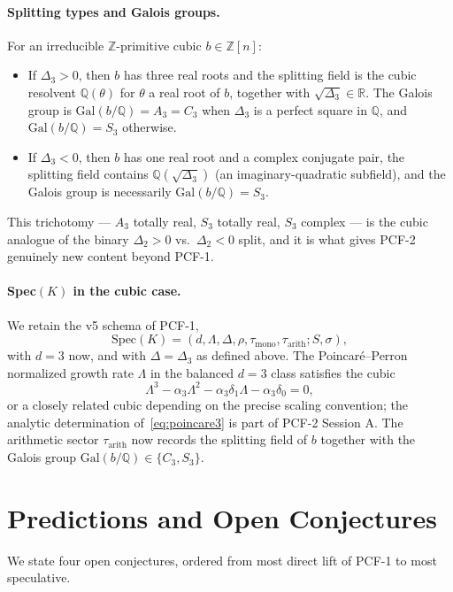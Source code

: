 \documentclass[11pt,a4paper]{article}
\theoremstyle{definition}
\theoremstyle{remark}
\newcommand{\Q}{\mathbb{Q}}
\newcommand{\Z}{\mathbb{Z}}
\newcommand{\R}{\mathbb{R}}
\newcommand{\Gal}{\mathrm{Gal}}
\newcommand{\Spec}{\mathrm{Spec}}
\begin{document}
\paragraph{Splitting types and Galois groups.}
For an irreducible $\Z$-primitive cubic $b\in\Z[n]$:
\begin{itemize}
\item If $\Delta_{3}>0$, then $b$ has three real roots and the splitting
field is the cubic resolvent $\Q(\theta)$ for $\theta$ a real root of $b$,
together with $\sqrt{\Delta_{3}}\in\R$. The Galois group is
$\Gal(b/\Q)=A_{3}=C_{3}$ when $\Delta_{3}$ is a perfect square in $\Q$,
and $\Gal(b/\Q)=S_{3}$ otherwise.
\item If $\Delta_{3}<0$, then $b$ has one real root and a complex
conjugate pair, the splitting field contains $\Q(\sqrt{\Delta_{3}})$
(an imaginary-quadratic subfield), and the Galois group is necessarily
$\Gal(b/\Q)=S_{3}$.
\end{itemize}
This trichotomy --- $A_{3}$ totally real, $S_{3}$ totally real,
$S_{3}$ complex --- is the cubic analogue of the binary
$\Delta_{2}>0$ vs.\ $\Delta_{2}<0$ split, and it is what gives PCF-2
genuinely new content beyond PCF-1.

\paragraph{Spec$(K)$ in the cubic case.}
We retain the v5 schema of PCF-1,
\[
\Spec(K)=(d,\Lambda,\Delta,\rho,\tau_{\mathrm{mono}},\tau_{\mathrm{arith}};S,\sigma),
\]
with $d=3$ now, and with $\Delta=\Delta_{3}$ as defined above. The
Poincar\'e--Perron normalized growth rate $\Lambda$ in the balanced
$d=3$ class satisfies the cubic
\begin{equation}\label{eq:poincare3}
\Lambda^{3}-\alpha_{3}\Lambda^{2}-\alpha_{3}\delta_{1}\Lambda-\alpha_{3}\delta_{0}=0,
\end{equation}
or a closely related cubic depending on the precise scaling
convention; the analytic determination of~\eqref{eq:poincare3} is part
of PCF-2 Session A. The arithmetic sector $\tau_{\mathrm{arith}}$ now
records the splitting field of $b$ together with the Galois group
$\Gal(b/\Q)\in\{C_{3},S_{3}\}$.

\section{Predictions and Open Conjectures}\label{sec:conjectures}

We state four open conjectures, ordered from most direct lift of PCF-1 to
most speculative.
\end{document}
